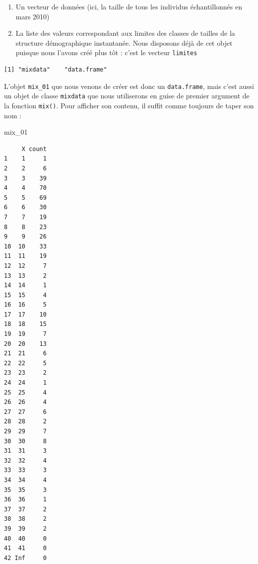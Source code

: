 \documentclass[
  a4paper,
  DIV=11,
  numbers=noendperiod,
  oneside]{scrreprt}
\newenvironment{Shaded}{}{}
\newcommand{\AttributeTok}[1]{\textcolor[rgb]{0.84,0.23,0.29}{#1}}
\newcommand{\FunctionTok}[1]{\textcolor[rgb]{0.44,0.26,0.76}{#1}}
\newcommand{\NormalTok}[1]{\textcolor[rgb]{0.14,0.16,0.18}{#1}}
\newcommand{\OtherTok}[1]{\textcolor[rgb]{0.44,0.26,0.76}{#1}}
\newcommand{\SpecialCharTok}[1]{\textcolor[rgb]{0.00,0.36,0.77}{#1}}
\providecommand{\tightlist}{%
  \setlength{\itemsep}{0pt}\setlength{\parskip}{0pt}}\usepackage{longtable,booktabs,array}
\begin{document}
\begin{enumerate}
\def\labelenumi{\arabic{enumi}.}
\tightlist
\item
  Un vecteur de données (ici, la taille de tous les individus
  échantillonnés en mars 2010)
\item
  La liste des valeurs correspondant aux limites des classes de tailles
  de la structure démographique instantanée. Nous disposons déjà de cet
  objet puisque nous l'avons créé plus tôt : c'est le vecteur
  \texttt{limites}
\end{enumerate}

\begin{Shaded}
\end{Shaded}

\begin{verbatim}
[1] "mixdata"    "data.frame"
\end{verbatim}

L'objet \texttt{mix\_01} que nous venons de créer est donc un
\texttt{data.frame}, mais c'est aussi un objet de classe
\texttt{mixdata} que nous utiliserons en guise de premier argument de la
fonction \texttt{mix()}. Pour afficher son contenu, il suffit comme
toujours de taper son nom :

\begin{Shaded}
\begin{Highlighting}[]
\NormalTok{mix\_01}
\end{Highlighting}
\end{Shaded}

\begin{verbatim}
     X count
1    1     1
2    2     6
3    3    39
4    4    70
5    5    69
6    6    30
7    7    19
8    8    23
9    9    26
10  10    33
11  11    19
12  12     7
13  13     2
14  14     1
15  15     4
16  16     5
17  17    10
18  18    15
19  19     7
20  20    13
21  21     6
22  22     5
23  23     2
24  24     1
25  25     4
26  26     4
27  27     6
28  28     2
29  29     7
30  30     8
31  31     3
32  32     4
33  33     3
34  34     4
35  35     3
36  36     1
37  37     2
38  38     2
39  39     2
40  40     0
41  41     0
42 Inf     0
\end{verbatim}
\end{document}
